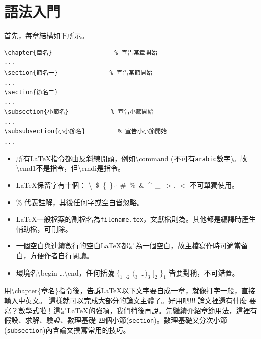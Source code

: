 \chapter{\protect 語法入門}
首先，每章結構如下所示。

\begin{Verbatim}[frame=single,firstline=1,label=Every chapter]
\chapter{章名}   　　　　　　　　 % 宣告某章開始
...
\section{節名一}　　　　　　　　 % 宣告某節開始
...
\section{節名二}
...
\subsection{小節名}　　　　　　　% 宣告小節開始
...
\subsubsection{小小節名}         % 宣告小小節開始
...
\end{Verbatim}
\begin{itemize}
\item 所有\LaTeX{}指令都由反斜線開頭，例如\textbackslash command (不可有{\tt arabic}數字)。故\textbackslash cmd1不是指令，但\textbackslash cmdi是指令。 
\item \LaTeX{}保留字有十個： \textbackslash\  \$\ \{\ \}\ $\tilde{}$\ \#\ \%\ \&\ \textasciicircum\
 \_\ $>$, $<$ 不可單獨使用。  
\item \% 代表註解，其後任何字或空白皆忽略。
\item \LaTeX{}一般檔案的副檔名為{\tt filename.tex}，文獻檔則為。其他都是編譯時產生輔助檔，可刪除。
\item 一個空白與連續數行的空白\LaTeX{}都是為一個空白，故主檔寫作時可適當留白，方便作者自行閱讀。
\item 環境名\textbackslash begin \ldots \textbackslash end，任何括號 $\{_1$ $[_2$ $(_{3}$ \ldots $)_3$ $]_2$ $\}_1$ 皆要對稱，不可錯置。
\end{itemize}
用{\textbackslash chapter\{章名\}}指令後，告訴\LaTeX{}以下文字要自成一章，就像打字一般，直接輸入中英文。
這樣就可以完成大部分的論文主體了。好用吧!!! 論文裡還有什麼
要寫？數學式啦！這是\LaTeX{}的強項，我們稍後再說。先繼續介紹章節用法，這裡有假設、求解、驗證、數理基礎 四個小節({\tt section})。數理基礎又分次小節({\tt subsection})內含論文撰寫常用的技巧。


